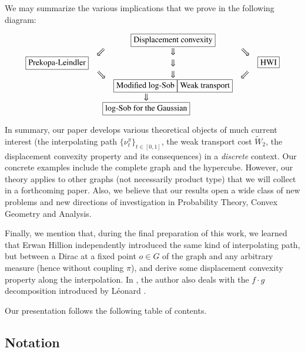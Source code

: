 \documentclass[11pt]{amsart}
\numberwithin{equation}{section}
\begin{document}
\medskip

We may summarize  the various implications that we prove in the following diagram:

$$
\begin{array}{ccccc}
 & & \fbox{Displacement convexity} & & \\
 & \Swarrow & \Downarrow & \Searrow & \\
 \fbox{Prekopa-Leindler} & &\Downarrow & & \fbox{HWI} \\ 
  & \Searrow & \Downarrow & \Swarrow & \\
 & & \fbox{Modified log-Sob} \fbox{Weak transport} & & \\
 &  & \hspace{-2,3cm} \Downarrow &  & \\
  & & \hspace{-2,3cm} \fbox{log-Sob for the Gaussian}& & 
\end{array}
$$

\medskip

In summary, our paper develops  various theoretical objects of much current interest (the interpolating path $\{\nu_t^\pi\}_{t\in [0,1]}$, the weak transport cost 
$\widetilde W_2$, the displacement convexity property and its consequences) in a {\em discrete} context.  
Our concrete examples include the complete graph and the hypercube. However, our theory applies to other graphs (not necessarily product type) that we will collect in a forthcoming paper. 
Also, we believe that our results open a wide class of new problems and new directions of investigation in Probability Theory, Convex Geometry and Analysis.

\medskip

Finally, we mention that, during the final preparation of this work, we learned that Erwan Hillion independently introduced the same kind of interpolating path, but between a Dirac at a fixed point $o \in G$ of the graph and any arbitrary measure (hence without coupling $\pi$), and  derive some displacement convexity property \cite{hillion} along the interpolation. In \cite{hillion}, the author also deals with the $f \cdot g$ decomposition introduced by  L\'eonard \cite{leonard}.

\medskip

Our presentation follows the following table of contents.

\tableofcontents

\subsection{Notation} \label{sec:notation}
\end{document}
